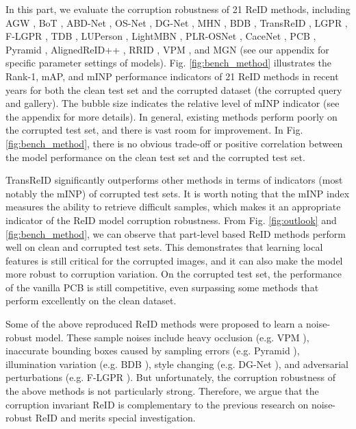 In this part, we evaluate the corruption robustness of 21 ReID methods, including AGW \cite{DBLP:journals/corr/abs-2001-04193}, BoT \cite{DBLP:conf/cvpr/0004GLL019}, ABD-Net \cite{DBLP:conf/iccv/ChenDXYCYRW19}, OS-Net \cite{DBLP:conf/iccv/ZhouYCX19}, DG-Net \cite{DBLP:journals/tomccap/ZhengZY18}, MHN \cite{DBLP:conf/iccv/ChenDH19}, BDB \cite{DBLP:conf/iccv/DaiCGZT19}, TransReID \cite{DBLP:journals/corr/abs-2102-04378}, LGPR \cite{DBLP:journals/corr/abs-2101-08533}, F-LGPR \cite{DBLP:journals/corr/abs-2101-08783}, TDB \cite{DBLP:conf/icpr/QuispeP20}, LUPerson \cite{DBLP:journals/corr/abs-2012-03753}, LightMBN \cite{DBLP:journals/corr/abs-2101-10774}, PLR-OSNet \cite{DBLP:conf/prcv/XieWZZL20}, CaceNet \cite{yu2020devil}, PCB \cite{DBLP:conf/eccv/SunZYTW18}, Pyramid \cite{DBLP:conf/cvpr/ZhengDSJGYHJ19}, AlignedReID++ \cite{DBLP:journals/pr/LuoJZFQZ19}, RRID \cite{DBLP:conf/aaai/ParkH20}, VPM \cite{DBLP:conf/cvpr/SunXLZLWS19}, and MGN \cite{DBLP:conf/mm/WangYCLZ18} (see our appendix for specific parameter settings of models).
Fig. \ref{fig:bench_method} illustrates the Rank-1, mAP, and mINP performance indicators of 21 ReID methods in recent years for both the clean test set and the corrupted dataset (the corrupted query and gallery).
The bubble size indicates the relative level of mINP indicator (see the appendix for more details).
In general, existing methods perform poorly on the corrupted test set, and there is vast room for improvement.
In Fig. \ref{fig:bench_method}, there is no obvious trade-off or positive correlation between the model performance on the clean test set and the corrupted test set.

TransReID \cite{DBLP:journals/corr/abs-2102-04378} significantly outperforms other methods in terms of indicators (most notably the mINP) of corrupted test sets.
It is worth noting that the mINP index measures the ability to retrieve difficult samples, which makes it an appropriate indicator of the ReID model corruption robustness.
From Fig. \ref{fig:outlook} and \ref{fig:bench_method}, we can observe that part-level based ReID methods perform well on clean and corrupted test sets. This demonstrates that learning local features is still critical for the corrupted images, and it can also make the model more robust to corruption variation.
On the corrupted test set, the performance of the vanilla PCB \cite{DBLP:conf/eccv/SunZYTW18} is still competitive, even surpassing some methods that perform excellently on the clean dataset.

Some of the above reproduced ReID methods were proposed to learn a noise-robust model.
These sample noises include heavy occlusion (e.g. VPM \cite{DBLP:conf/cvpr/SunXLZLWS19}), inaccurate bounding boxes caused by sampling errors (e.g. Pyramid \cite{DBLP:conf/cvpr/ZhengDSJGYHJ19}), illumination variation (e.g. BDB \cite{DBLP:conf/iccv/DaiCGZT19}), style changing (e.g. DG-Net \cite{DBLP:journals/tomccap/ZhengZY18}), and adversarial perturbations (e.g. F-LGPR \cite{DBLP:journals/corr/abs-2101-08783}).
But unfortunately, the corruption robustness of the above methods is not particularly strong.
Therefore, we argue that the corruption invariant ReID is complementary to the previous research on noise-robust ReID and merits special investigation.


